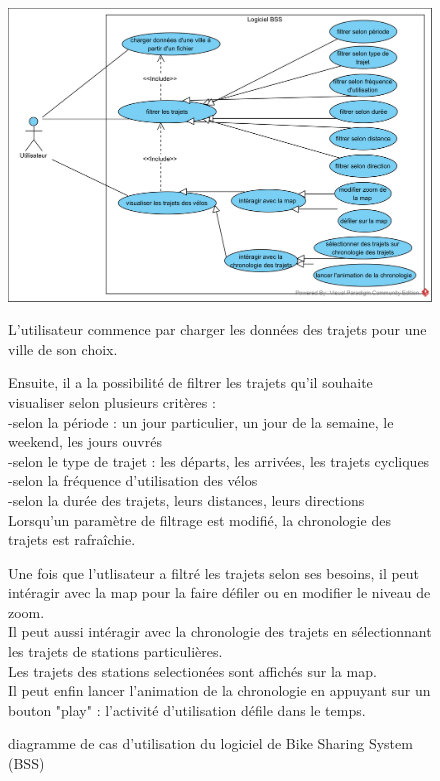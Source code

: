 \documentclass[12pt]{article}
\begin{document}
		\begin{figure}[!ht]
		\includegraphics[scale=1]{Use_case_1.png}
		\caption{diagramme de cas d'utilisation du logiciel de Bike Sharing System (BSS)}
		\medskip
		L'utilisateur commence par charger les données des trajets pour une ville de son choix.\par

		Ensuite, il a la possibilité de filtrer les trajets qu'il souhaite visualiser selon plusieurs critères :\\
			-selon la période : un jour particulier, un jour de la semaine, le weekend, les jours ouvrés\\
			-selon le type de trajet : les départs, les arrivées, les trajets cycliques\\
			-selon la fréquence d'utilisation des vélos\\
			-selon la durée des trajets, leurs distances, leurs directions\\
		Lorsqu'un paramètre de filtrage est modifié, la chronologie des trajets est rafraîchie.\par

		Une fois que l'utlisateur a filtré les trajets selon ses besoins, il peut intéragir avec la map pour la faire défiler ou en modifier le niveau de zoom.\\
		Il peut aussi intéragir avec la chronologie des trajets en sélectionnant les trajets de stations particulières.\\
		Les trajets des stations selectionées sont affichés sur la map.\\
		Il peut enfin lancer l'animation de la chronologie en appuyant sur un bouton "play" : l'activité d'utilisation défile dans le temps.
		\end{figure}
		\newpage
\end{document}
